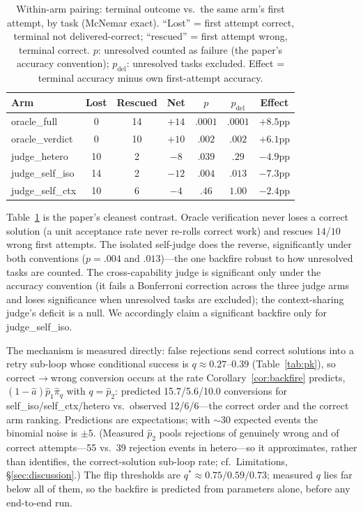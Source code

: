 \documentclass[11pt]{article}
\begin{document}
\begin{table}[t]
\centering\small
\caption{Within-arm pairing: terminal outcome vs.\ the same arm's
first attempt, by task (McNemar exact).  ``Lost'' = first attempt
correct, terminal not delivered-correct; ``rescued'' = first attempt
wrong, terminal correct.  $p$: unresolved counted as failure (the
paper's accuracy convention); $p_{\mathrm{del}}$: unresolved tasks
excluded.  Effect = terminal accuracy minus own first-attempt
accuracy.}
\label{tab:within}
\begin{tabular}{lcccccc}
\toprule
Arm & Lost & Rescued & Net & $p$ & $p_{\mathrm{del}}$ & Effect\\
\midrule
oracle\_full      & 0  & 14 & $+14$ & $.0001$ & $.0001$ & $+8.5$pp\\
oracle\_verdict   & 0  & 10 & $+10$ & $.002$  & $.002$  & $+6.1$pp\\
judge\_hetero     & 10 & 2  & $-8$  & $.039$  & $.29$   & $-4.9$pp\\
judge\_self\_iso  & 14 & 2  & $-12$ & $.004$  & $.013$  & $-7.3$pp\\
judge\_self\_ctx  & 10 & 6  & $-4$  & $.46$   & $1.00$  & $-2.4$pp\\
\bottomrule
\end{tabular}
\end{table}

Table~\ref{tab:within} is the paper's cleanest contrast.  Oracle
verification never loses a correct solution (a unit acceptance rate
never re-rolls correct work) and rescues $14$/$10$ wrong first
attempts.  The isolated self-judge does the reverse, significantly
under both conventions ($p = .004$ and $.013$)---the one backfire
robust to how unresolved tasks are counted.  The cross-capability
judge is significant only under the accuracy convention (it fails
a Bonferroni correction across the three judge arms and loses
significance when unresolved tasks are excluded); the
context-sharing judge's deficit is a null.  We accordingly claim a
significant backfire only for \textsf{judge\_self\_iso}.

The mechanism is measured directly: false rejections
send correct solutions into a retry sub-loop whose conditional
success is $q \approx 0.27$--$0.39$ (Table~\ref{tab:pk}), so
correct$\to$wrong conversion occurs at the rate
Corollary~\ref{cor:backfire} predicts, $(1-\hat a)\hat p_1
\hat\pi_q$ with $q = \hat p_2$: predicted 15.7/5.6/10.0 conversions
for \textsf{self\_iso}/\textsf{self\_ctx}/\textsf{hetero} vs.\
observed 12/6/6---the correct order and the correct arm ranking.
Predictions are expectations; with ${\sim}30$ expected events the
binomial noise is ${\pm}5$.  (Measured $\hat p_2$ pools rejections
of genuinely wrong and of correct attempts---55 vs.\ 39 rejection
events in \textsf{hetero}---so it approximates, rather than
identifies, the correct-solution sub-loop rate; cf.\ Limitations,
§\ref{sec:discussion}.)  The flip thresholds are
$q^\ast \approx 0.75/0.59/0.73$; measured $q$ lies far below all of
them, so the backfire is predicted from parameters alone, before
any end-to-end run.
\end{document}
